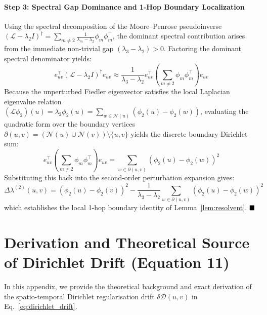 \documentclass[sigconf]{acmart}
\begin{document}
\paragraph{Step 3: Spectral Gap Dominance and 1-Hop Boundary Localization}
Using the spectral decomposition of the Moore--Penrose pseudoinverse $(\mathcal{L} - \lambda_2 I)^\dagger = \sum_{m \neq 2} \frac{1}{\lambda_m - \lambda_2} \phi_m \phi_m^\top$, the dominant spectral contribution arises from the immediate non-trivial gap $(\lambda_3 - \lambda_2) > 0$. Factoring the dominant spectral denominator yields:
\begin{equation}
e_{uv}^\top \left( \mathcal{L} - \lambda_2 I \right)^\dagger e_{uv} \approx \frac{1}{\lambda_3 - \lambda_2} e_{uv}^\top \left( \sum_{m \neq 2} \phi_m \phi_m^\top \right) e_{uv}
\end{equation}
Because the unperturbed Fiedler eigenvector satisfies the local Laplacian eigenvalue relation $(\mathcal{L} \phi_2)(u) = \lambda_2 \phi_2(u) = \sum_{w \in \mathcal{N}(u)} (\phi_2(u) - \phi_2(w))$, evaluating the quadratic form over the boundary vertices $\partial(u, v) = (\mathcal{N}(u) \cup \mathcal{N}(v)) \setminus \{u, v\}$ yields the discrete boundary Dirichlet sum:
\begin{equation}
e_{uv}^\top \left( \sum_{m \neq 2} \phi_m \phi_m^\top \right) e_{uv} = \sum_{w \in \partial(u, v)} \left( \phi_2(u) - \phi_2(w) \right)^2
\end{equation}
Substituting this back into the second-order perturbation expansion gives:
\begin{equation}
\Delta \lambda^{(2)}(u, v) = \left( \phi_2(u) - \phi_2(v) \right)^2 - \frac{1}{\lambda_3 - \lambda_2} \sum_{w \in \partial(u, v)} \left( \phi_2(u) - \phi_2(w) \right)^2
\end{equation}
which establishes the local 1-hop boundary identity of Lemma~\ref{lem:resolvent}. $\hfill \blacksquare$

\section{Derivation and Theoretical Source of Dirichlet Drift (Equation 11)}
\label{app:proof_dirichlet_drift}
In this appendix, we provide the theoretical background and exact derivation of the spatio-temporal Dirichlet regularisation drift $\delta \mathcal{D}(u, v)$ in Eq.~\eqref{eq:dirichlet_drift}.
\end{document}
